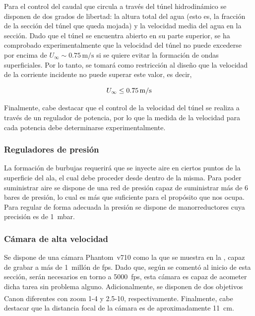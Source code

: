 Para el control del caudal que circula a través del túnel hidrodinámico se disponen de dos grados de libertad: la altura total del agua (esto es, la fracción de la sección del túnel que queda mojada) y la velocidad media del agua en la sección. Dado que el túnel se encuentra abierto en su parte superior, se ha comprobado experimentalmente que la velocidad del túnel no puede excederse por encima de $U_{\infty} \sim 0.75\,\mathrm{m/s}$ si se quiere evitar la formación de ondas superficiales. Por lo tanto, se tomará como restricción al diseño que la velocidad de la corriente incidente no puede superar este valor, es decir,

\begin{equation}
U_{\infty} \leq 0.75\,\mathrm{m/s}
\LABEQ{restrVel}
\end{equation}

Finalmente, cabe destacar que el control de la velocidad del túnel se realiza a través de un regulador de potencia, por lo que la medida de la velocidad para cada potencia debe determinarse experimentalmente. 

\subsubsection*{Reguladores de presión}

La formación de burbujas requerirá que se inyecte aire en ciertos puntos de la superficie del ala, el cual debe proceder desde dentro de la misma. Para poder suministrar aire se dispone de una red de presión capaz de suministrar más de 6 bares de presión, lo cual es más que suficiente para el propósito que nos ocupa. Para regular de forma adecuada la presión se dispone de manorreductores cuya precisión es de 1~mbar. 

\subsubsection*{Cámara de alta velocidad}

Se dispone de una cámara Phantom~v710 como la que se muestra en la , capaz de grabar a más de 1~millón de fps. Dado que, según se comentó al inicio de esta sección, serán necesarios en torno a 5000~fps, esta cámara es capaz de acometer dicha tarea sin problema alguno.  Adicionalmente, se disponen de dos objetivos Canon\textsuperscript{\textregistered} diferentes  con zoom 1-4 y 2.5-10, respectivamente. Finalmente, cabe destacar que la distancia focal de la cámara es de aproximadamente 11~cm.


